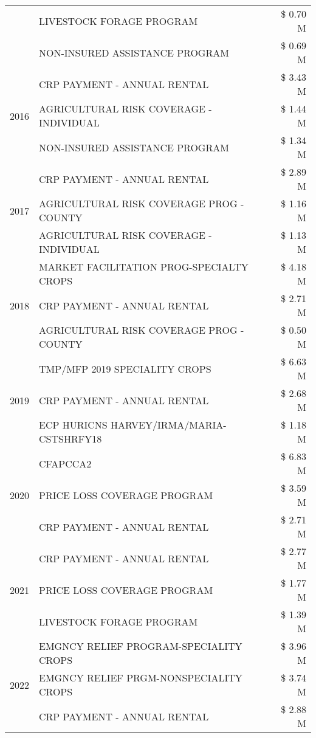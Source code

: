\begin{tabular}{llr}
 & LIVESTOCK FORAGE PROGRAM & \$ 0.70 M \\
 & NON-INSURED ASSISTANCE PROGRAM & \$ 0.69 M \\
\cline{1-3}
\multirow[t]{3}{*}{2016} & CRP PAYMENT - ANNUAL RENTAL & \$ 3.43 M \\
 & AGRICULTURAL RISK COVERAGE - INDIVIDUAL & \$ 1.44 M \\
 & NON-INSURED ASSISTANCE PROGRAM & \$ 1.34 M \\
\cline{1-3}
\multirow[t]{3}{*}{2017} & CRP PAYMENT - ANNUAL RENTAL & \$ 2.89 M \\
 & AGRICULTURAL RISK COVERAGE PROG - COUNTY & \$ 1.16 M \\
 & AGRICULTURAL RISK COVERAGE - INDIVIDUAL & \$ 1.13 M \\
\cline{1-3}
\multirow[t]{3}{*}{2018} & MARKET FACILITATION PROG-SPECIALTY CROPS & \$ 4.18 M \\
 & CRP PAYMENT - ANNUAL RENTAL & \$ 2.71 M \\
 & AGRICULTURAL RISK COVERAGE PROG - COUNTY & \$ 0.50 M \\
\cline{1-3}
\multirow[t]{3}{*}{2019} & TMP/MFP 2019 SPECIALITY CROPS & \$ 6.63 M \\
 & CRP PAYMENT - ANNUAL RENTAL & \$ 2.68 M \\
 & ECP HURICNS HARVEY/IRMA/MARIA-CSTSHRFY18 & \$ 1.18 M \\
\cline{1-3}
\multirow[t]{3}{*}{2020} & CFAPCCA2 & \$ 6.83 M \\
 & PRICE LOSS COVERAGE PROGRAM & \$ 3.59 M \\
 & CRP PAYMENT - ANNUAL RENTAL & \$ 2.71 M \\
\cline{1-3}
\multirow[t]{3}{*}{2021} & CRP PAYMENT - ANNUAL RENTAL & \$ 2.77 M \\
 & PRICE LOSS COVERAGE PROGRAM & \$ 1.77 M \\
 & LIVESTOCK FORAGE PROGRAM & \$ 1.39 M \\
\cline{1-3}
\multirow[t]{3}{*}{2022} & EMGNCY RELIEF PROGRAM-SPECIALITY CROPS & \$ 3.96 M \\
 & EMGNCY RELIEF PRGM-NONSPECIALITY CROPS & \$ 3.74 M \\
 & CRP PAYMENT - ANNUAL RENTAL & \$ 2.88 M \\
\cline{1-3}
\bottomrule
\end{tabular}
